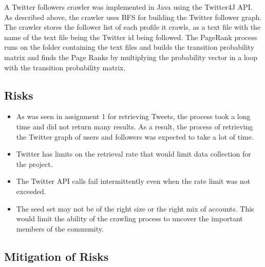 \documentclass{sig-alternate-05-2015}
\begin{document}
A Twitter followers crawler was implemented in Java using the Twitter4J API. As described above, the crawler uses BFS for building the Twitter follower graph. The crawler stores the follower list of each profile it crawls, as a text file with the name of the text file being the Twitter id being followed. The PageRank process runs on the folder containing the text files and builds the transition probability matrix and finds the Page Ranks by multiplying the probability vector in a loop with the transition probability matrix. 

\subsection{Risks}

\begin{itemize}

\item As was seen in assignment 1 for retrieving Tweets, the process took a long time and did not return many results. As a result, the process of retrieving the Twitter graph of users and followers was expected to take a lot of time.

\item Twitter has limits on the retrieval rate that would limit data collection for the project.

\item The Twitter API calls fail intermittently even when the rate limit was not exceeded. 

\item The seed set may not be of the right size or the right mix of accounts. This would limit the ability of the crawling process to uncover the important members of the community.

\end{itemize}

\subsection{Mitigation of Risks}
\end{document}
